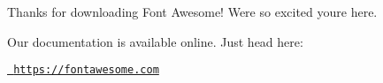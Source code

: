 Thanks for downloading Font Awesome! We\textquotesingle{}re so excited you\textquotesingle{}re here.

Our documentation is available online. Just head here\+:

\href{https://fontawesome.com}{\texttt{ https\+://fontawesome.\+com}} 